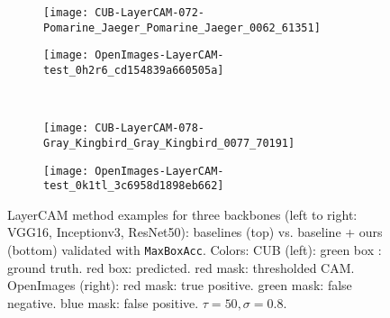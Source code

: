 \documentclass[twocolumn]{article}
\newcommand\maxboxacc{\texttt{MaxBoxAcc}\xspace}
\theoremstyle{definition}
\begin{document}
\begin{figure*}
\begin{subfigure}[b]{0.49\textwidth}
         \texttt{[image: CUB-LayerCAM-072-Pomarine\_Jaeger\_Pomarine\_Jaeger\_0062\_61351]}
     \end{subfigure}
     \hfill
     \begin{subfigure}[b]{0.49\textwidth}
         \centering
         \texttt{[image: OpenImages-LayerCAM-test\_0h2r6\_cd154839a660505a]}
     \end{subfigure}
     \\
     \vspace{0.1cm}
     \begin{subfigure}[b]{0.49\textwidth}
         \centering
         \texttt{[image: CUB-LayerCAM-078-Gray\_Kingbird\_Gray\_Kingbird\_0077\_70191]}
     \end{subfigure}
     \hfill
     \begin{subfigure}[b]{0.49\textwidth}
         \centering
         \texttt{[image: OpenImages-LayerCAM-test\_0k1tl\_3c6958d1898eb662]}
     \end{subfigure}
        \caption{LayerCAM method examples for three backbones (left to right: VGG16, Inceptionv3, ResNet50): baselines (top) vs. baseline + ours (bottom)  validated with \maxboxacc. Colors: CUB (left): green box : ground truth. red box: predicted. red mask: thresholded CAM. OpenImages (right): red mask: true positive. green mask: false negative. blue mask: false positive. ${\tau=50, \sigma=0.8}$.}
        \label{fig:layercam-cub-openim-example-pred}
\end{figure*}
\end{document}
